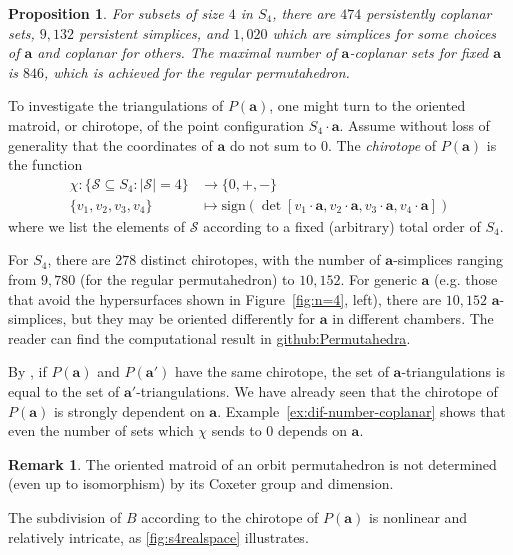 \documentclass{amsart}
\newtheorem{prop}[thm]{Proposition}
\theoremstyle{definition}
\newtheorem{rmk}[thm]{Remark}
\def\ba{\mathbf{a}}
\def\perm_#1{P(#1)}
\def\cS{\mathcal{S}}
\begin{document}
\begin{prop}\label{prop:s4-classification}
    For subsets of size $4$ in $S_4$, there are $474$ persistently coplanar sets, $9,132$ persistent simplices, and $1,020$ which are simplices for some choices of $\ba$ and coplanar for others. The maximal number of $\ba$-coplanar sets for fixed $\ba$ is $846$, which is achieved for the regular permutahedron.
\end{prop}

To investigate the triangulations of $\perm_\ba$, one might turn to the oriented matroid, or chirotope, of the point configuration $S_4 \cdot \ba$. Assume without loss of generality that the coordinates of $\ba$ do not sum to 0. The \emph{chirotope} of $\perm_\ba$ is the function
\begin{align*}\chi:\{\cS \subseteq S_4:|\cS|=4\} &\to \{0,+, -\} \\
\{v_1, v_2, v_3, v_4\} &\mapsto \mathrm{sign}(\det[v_1 \cdot \ba, v_2 \cdot \ba, v_3 \cdot \ba, v_4 \cdot \ba])
\end{align*}
where we list the elements of $\cS$ according to a fixed (arbitrary) total order of $S_4$.

For $S_4$, there are $278$ distinct chirotopes, with the number of $\ba$-simplices ranging from $9,780$ (for the regular permutahedron) to $10,152$. For generic $\ba$ (e.g. those that avoid the hypersurfaces shown in Figure~\ref{fig:n=4}, left), there are $10,152$ $\ba$-simplices, but they may be oriented differently for $\ba$ in different chambers. The reader can find the computational result in \href{https://github.com/TKing321/Permutahedra}{github:Permutahedra}.

By \cite[Corollary 4.1.44]{DLRS10}, if $\perm_\ba$ and $\perm_{\ba'}$ have the same chirotope, the set of $\ba$-triangulations is equal to the set of $\ba'$-triangulations. We have already seen that the chirotope of $\perm_\ba$ is strongly dependent on $\ba$. Example~\ref{ex:dif-number-coplanar} shows that even the number of sets which $\chi$ sends to $0$ depends on $\ba$. 

\begin{rmk}
    The oriented matroid of an orbit permutahedron is not determined (even up to isomorphism) by its Coxeter group and dimension.
\end{rmk}

The subdivision of $B$ according to the chirotope of $\perm_\ba$ is nonlinear and relatively intricate, as \cref{fig:s4realspace} illustrates.
\end{document}
